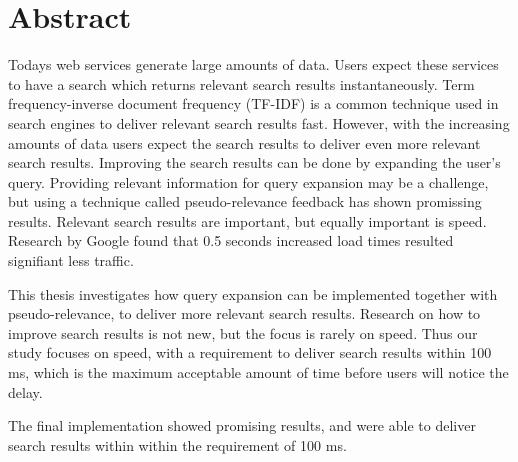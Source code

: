 \chapter*{Abstract}
Todays web services generate large amounts of data.
Users expect these services to have a search which returns relevant search results instantaneously.
Term frequency-inverse document frequency (TF-IDF) is a common technique used in search engines to deliver relevant search results fast.
However,
with the increasing amounts of data users expect the search results to deliver even more relevant search results.
Improving the search results can be done by expanding the user's query.
Providing relevant information for query expansion may be a challenge,
but using a technique called pseudo-relevance feedback has shown promissing results.
Relevant search results are important, but equally important is speed.
Research by Google \cite{google-marissa} found that 0.5 seconds increased load times resulted signifiant less traffic.

This thesis investigates how query expansion can be implemented together with pseudo-relevance,
to deliver more relevant search results.
Research on how to improve search results is not new,
but the focus is rarely on speed.
Thus our study focuses on speed, with a requirement to deliver search results within 100 ms,
which is the maximum acceptable amount of time before users will notice the delay.

The final implementation showed promising results,
and were able to deliver search results within within the requirement of 100 ms.
